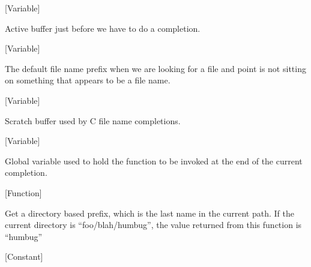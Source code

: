 \vspace{1em}
\noindent
{}
\usebox{\funcname}
 \hfill [Variable]

\begin{doc-string}
Active buffer just before we have to do a completion.
\end{doc-string}

\vspace{1em}
\noindent
{}
\usebox{\funcname}
 \hfill [Variable]

\begin{doc-string}
The default file name prefix when we are looking for a file and point is not
sitting on something that appears to be a file name.
\end{doc-string}

\vspace{1em}
\noindent
{}
\usebox{\funcname}
 \hfill [Variable]

\begin{doc-string}
Scratch buffer used by C file name completions.
\end{doc-string}

\vspace{1em}
\noindent
{}
\usebox{\funcname}
 \hfill [Variable]

\begin{doc-string}
Global variable used to hold the function to be invoked at the end of the
current completion.
\end{doc-string}

\vspace{1em}
\noindent
{}
\usebox{\funcname}
 \hfill [Function]

\begin{doc-string}
Get a directory based prefix, which is the last name in the current path.  If the current
directory is ``foo/blah/humbug'', the value returned from this function is ``humbug''
\end{doc-string}

\vspace{1em}
\noindent
{}
\usebox{\funcname}
 \hfill [Constant]

